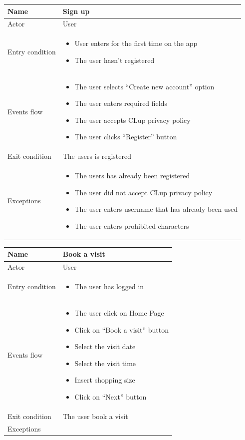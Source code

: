 \begin{tabular}{|p{5cm} | p{7cm} | }
	\hline
	Name & Sign up \\
	\hline
	Actor & User \\
	\hline
	Entry condition &
	\begin{itemize}
		\item User enters for the first time on the app 
		\item The user hasn’t registered
	\end{itemize} \\
	\hline
	Events flow & 
	\begin{itemize}
		\item The user selects “Create new account” option
		\item The user enters required fields
		\item The user accepts CLup privacy policy
		\item The user clicks “Register” button
	\end{itemize} \\
	\hline
	Exit condition & The users is registered \\
	\hline 
	Exceptions &
	\begin{itemize}
		\item The users has already been registered
		\item The user did not accept CLup privacy policy
		\item The user enters username that has already been used
		\item The user enters prohibited characters
	\end{itemize} \\
	\hline
\end{tabular}

\par \medskip

\begin{tabular}{|p{5cm} | p{7cm} | }
	\hline
	Name & Book a visit \\
	\hline
	Actor & User \\
	\hline
	Entry condition &
	\begin{itemize}
		\item The user has logged in 
	\end{itemize} \\
	\hline
	Events flow & 
	\begin{itemize}
		\item The user click on Home Page
		\item Click on “Book a visit” button
		\item Select the visit date
		\item Select the visit time
		\item Insert shopping size
		\item Click on “Next” button
	\end{itemize} \\
	\hline
	Exit condition & The user book a visit \\
	\hline 
	Exceptions & \\
	\hline
\end{tabular}

